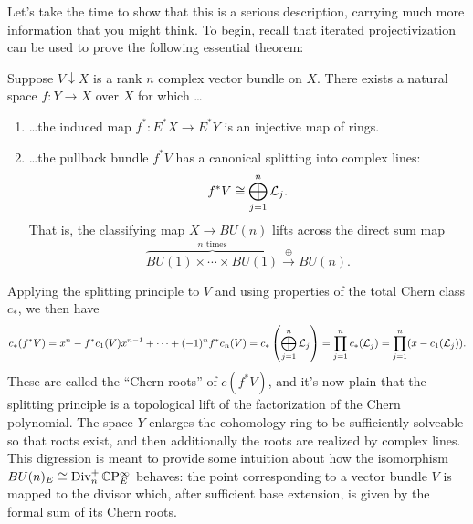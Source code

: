\noindent Let's take the time to show that this is a serious description, carrying much more information that you might think. To begin, recall that iterated projectivization can be used to prove the following essential theorem:

\begin{theorem}
Suppose $V \downarrow X$ is a rank $n$ complex vector bundle on $X$.  There exists a natural space $f: Y \to X$ over $X$ for which \ldots
\begin{enumerate}
\item \ldots the induced map $f^*: E^* X \to E^* Y$ is an injective map of rings.
\item \ldots the pullback bundle $f^* V$ has a canonical splitting into complex lines: \[f^* V \cong \bigoplus_{j=1}^n \mathcal{L}_j.\]  That is, the classifying map $X \to BU(n)$ lifts across the direct sum map \[\overset{\text{$n$ times}}{\overbrace{BU(1) \times \cdots \times BU(1)}} \xrightarrow{\oplus} BU(n).\]
\end{enumerate}
\end{theorem}

Applying the splitting principle to $V$ and using properties of the total Chern class $c_*$, we then have
\[
c_*(f^* V) = x^n - f^* c_1(V) x^{n-1} + \cdots + (-1)^n f^* c_n(V) = c_*\left( \bigoplus_{j=1}^n \mathcal{L}_j \right) = \prod_{j=1}^n c_*(\mathcal{L}_j) = \prod_{j=1}^n (x - c_1(\mathcal{L}_j)).
\]
These are called the ``Chern roots'' of $c(f^* V)$, and it's now plain that the splitting principle is a topological lift of the factorization of the Chern polynomial.  The space $Y$ enlarges the cohomology ring to be sufficiently solveable so that roots exist, and then additionally the roots are realized by complex lines.  This digression is meant to provide some intuition about how the isomorphism $BU(n)_E \cong \operatorname{Div}_n^+ \mathbb{C}\mathrm P^\infty_E$ behaves: the point corresponding to a vector bundle $V$ is mapped to the divisor which, after sufficient base extension, is given by the formal sum of its Chern roots.


